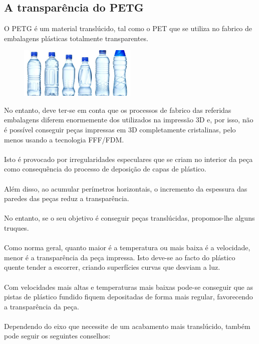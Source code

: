 \documentclass[11pt,a4paper]{article}
\begin{document}
	\subsection{A transparência do PETG}O PETG é um material translúcido, tal como o PET que se utiliza no fabrico de embalagens plásticas totalmente transparentes.
\begin{figure}[H]
\centering
\includegraphics[width=0.5\textwidth,cfbox=azul_marcos 1pt 0pt]{FOTOS/BOTELLASPET}
\end{figure}
No entanto, deve ter-se em conta que os processos de fabrico das referidas embalagens diferem enormemente dos utilizados na impressão 3D e, por isso, não é possível conseguir peças impressas em 3D completamente cristalinas, pelo menos usando a tecnologia FFF/FDM.
\\\\
Isto é provocado por irregularidades especulares que se criam no interior da peça como consequência do processo de deposição de capas de plástico.
\\\\
Além disso, ao acumular perímetros horizontais, o incremento da espessura das paredes das peças reduz a transparência.
\\\\
No entanto, se o seu objetivo é conseguir peças translúcidas, propomos-lhe alguns truques.
\\\\
Como norma geral, quanto maior é a temperatura ou mais baixa é a velocidade, menor é a transparência da peça impressa. Isto deve-se ao facto do plástico quente tender a escorrer, criando superfícies curvas que desviam a luz.
\\\\
Com velocidades mais altas e temperaturas mais baixas pode-se conseguir que as pistas de plástico fundido fiquem depositadas de forma mais regular, favorecendo a transparência da peça.
\\\\
Dependendo do eixo que necessite de um acabamento mais translúcido, também pode seguir os seguintes conselhos:
\end{document}
